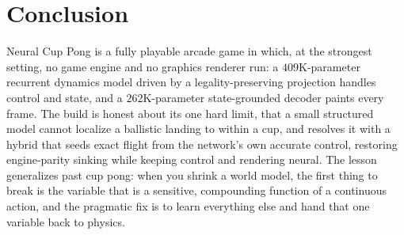 \documentclass[11pt]{article}
\begin{document}
\section{Conclusion}

Neural Cup Pong is a fully playable arcade game in which, at the strongest setting, no game engine and no graphics renderer run: a $409$K-parameter recurrent dynamics model driven by a legality-preserving projection handles control and state, and a $262$K-parameter state-grounded decoder paints every frame. The build is honest about its one hard limit, that a small structured model cannot localize a ballistic landing to within a cup, and resolves it with a hybrid that seeds exact flight from the network's own accurate control, restoring engine-parity sinking while keeping control and rendering neural. The lesson generalizes past cup pong: when you shrink a world model, the first thing to break is the variable that is a sensitive, compounding function of a continuous action, and the pragmatic fix is to learn everything else and hand that one variable back to physics.
\end{document}

